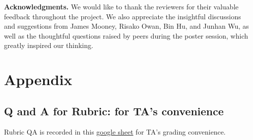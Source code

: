 \documentclass[11pt]{article}
\begin{document}

\textbf{Acknowledgments.} We would like to thank the reviewers for their valuable feedback throughout the project. We also appreciate the insightful discussions and suggestions from James Mooney, Risako Owan, Bin Hu, and Junhan Wu, as well as the thoughtful questions raised by peers during the poster session, which greatly inspired our thinking.


\nocite{*} %

\section{Appendix}


\subsection{Q and A for Rubric: for TA's convenience}
Rubric QA is recorded in this \href{https://docs.google.com/spreadsheets/d/1W_pmCWLjmBhsGSjDms_AUPLtigZsEp_DR7B2RvcxRu8/edit?gid=1508992498#gid=1508992498}{google sheet} for TA's grading convenience.
\end{document}
